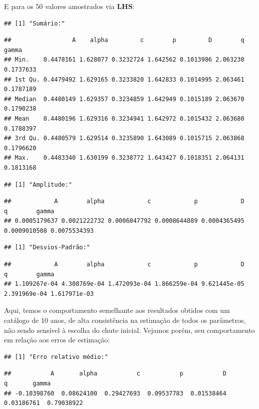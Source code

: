 \documentclass[11pt,]{article}
\begin{document}
E para os 50 valores amostrados via \textbf{LHS}:

\begin{verbatim}
## [1] "Sumário:"
\end{verbatim}

\begin{verbatim}
##                 A    alpha         c        p         D        q     gamma
## Min.    0.4478161 1.628077 0.3232724 1.642562 0.1013986 2.063230 0.1737633
## 1st Qu. 0.4479492 1.629165 0.3233820 1.642833 0.1014995 2.063461 0.1787189
## Median  0.4480149 1.629357 0.3234859 1.642949 0.1015189 2.063670 0.1790238
## Mean    0.4480196 1.629316 0.3234941 1.642972 0.1015432 2.063680 0.1788397
## 3rd Qu. 0.4480579 1.629514 0.3235890 1.643089 0.1015715 2.063868 0.1796620
## Max.    0.4483340 1.630199 0.3238772 1.643427 0.1018351 2.064131 0.1813168
\end{verbatim}

\begin{verbatim}
## [1] "Amplitude:"
\end{verbatim}

\begin{verbatim}
##            A        alpha            c            p            D            q        gamma 
## 0.0005179637 0.0021222732 0.0006047792 0.0008644889 0.0004365495 0.0009010508 0.0075534393
\end{verbatim}

\begin{verbatim}
## [1] "Desvios-Padrão:"
\end{verbatim}

\begin{verbatim}
##            A        alpha            c            p            D            q        gamma 
## 1.109267e-04 4.308769e-04 1.472093e-04 1.866259e-04 9.621445e-05 2.391969e-04 1.617971e-03
\end{verbatim}

Aqui, temos o comportamento semelhante aos resultados obtidos com um
catálogo de 10 anos, de alta consistência na estimação de todos os
parâmetros, não sendo sensível à escolha do chute inicial. Vejamos
porém, seu comportamento em relação aos erros de estimação:

\begin{verbatim}
## [1] "Erro relativo médio:"
\end{verbatim}

\begin{verbatim}
##           A       alpha           c           p           D           q       gamma 
## -0.10398760  0.08624100  0.29427693  0.09537783  0.01538464  0.03186761  0.79038922
\end{verbatim}
\end{document}
